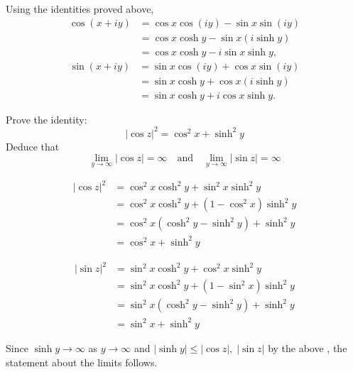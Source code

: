 \documentclass[answers, 12pt]{exam}
\begin{document}
\begin{questions}
\begin{solution}
    Using the identities proved above,
    \begin{align*}
        \cos(x+iy) &= \cos x\cos(iy) - \sin x\sin(iy)\\
        &=\cos x\cosh y - \sin x(i\sinh y)\\
        &=\cos x\cosh y - i\sin x\sinh y,
    \end{align*}
    \begin{align*}
        \sin(x+iy) &= \sin x\cos(iy) + \cos x\sin(iy)\\
        &=\sin x\cosh y + \cos x(i\sinh y)\\
        &=\sin x\cosh y + i\cos x\sinh y.
    \end{align*}
\end{solution}

\question
Prove the identity:
\[
    |\cos z|^2 = \cos^2 x + \sinh^2 y
\]
Deduce that
\[
    \lim_{y\to\infty} |\cos z| = \infty\quad\text{and}\quad
    \lim_{y\to\infty} |\sin z| = \infty
\]
\begin{solution}
    \begin{align*}
    |\cos z|^2 &= \cos^2 x\cosh^2 y + \sin^2 x\sinh^2 y\\
    &=  \cos^2 x\cosh^2 y + (1-\cos^2 x)\sinh^2 y\\
    &= \cos^2x(\cosh^2 y - \sinh^2 y) + \sinh^2 y\\
    &= \cos^2x + \sinh^2 y
\end{align*}

\begin{align*}
    |\sin z|^2 &= \sin^2 x\cosh^2 y + \cos^2 x\sinh^2 y\\
    &=  \sin^2 x\cosh^2 y + (1-\sin^2 x)\sinh^2 y\\
    &= \sin^2x(\cosh^2 y - \sinh^2 y) + \sinh^2 y\\
    &= \sin^2x + \sinh^2 y
\end{align*}

Since $\sinh y\to\infty$ as $y\to\infty$ and $|\sinh y|\leq |\cos z|,\;|\sin z|$ by the above ,
the statement about the limits follows.
\end{solution}



\end{questions}
\end{document}

